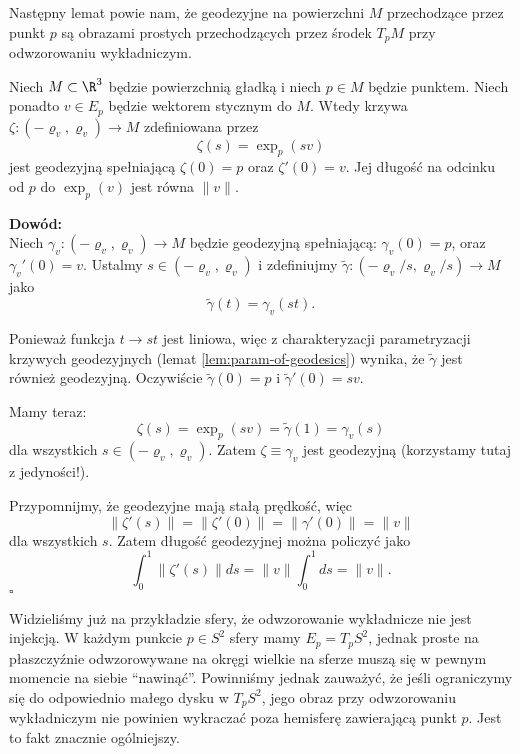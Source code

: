 \begin{frame}
\begin{center}

\end{center}

\end{frame}
Następny lemat powie nam, że geodezyjne na powierzchni $M$ przechodzące przez punkt $p$ są obrazami prostych przechodzących przez środek $T_pM$ przy odwzorowaniu wykładniczym.
\begin{frame}

\begin{lemat}
Niech $M\subset \R^3$ będzie powierzchnią gładką i niech $p\in M$ będzie punktem. Niech ponadto $v\in E_p$ będzie wektorem stycznym do $M$. Wtedy krzywa $\zeta\colon(-\varrho_v,\varrho_v)\to M$ zdefiniowana przez
\[\zeta(s)=\exp_p(sv)\] jest geodezyjną spełniającą $\zeta(0)=p$ oraz $\zeta'(0)=v$. Jej długość na odcinku od $p$ do $\exp_p(v)$ jest równa $\|v\|$.
\end{lemat}


\textcolor{ared}{\textbf{Dowód:}}\\\pause 
Niech $\gamma_v\colon (-\varrho_v,\varrho_v)\to M$ będzie geodezyjną spełniającą: $\gamma_v(0)=p$, oraz $\gamma_v'(0)=v$. Ustalmy $s\in (-\varrho_v,\varrho_v)$ i zdefiniujmy $\widetilde{\gamma}\colon(-\varrho_v/s,\varrho_v/s)\to M$ jako \[\widetilde{\gamma}(t)=\gamma_v(st).\]

\end{frame}
\begin{frame}
Ponieważ funkcja $t\to st$ jest liniowa, więc z charakteryzacji parametryzacji krzywych geodezyjnych (lemat \ref{lem:param-of-geodesics}) wynika, że $\widetilde{\gamma}$ jest również geodezyjną. Oczywiście $\widetilde{\gamma}(0)=p$ i $\widetilde{\gamma}'(0)=sv$.

\pause Mamy teraz:
\[\zeta(s)=\exp_p(sv)=\widetilde{\gamma}(1)=\gamma_v(s)\]
dla wszystkich $s\in (-\varrho_v, \varrho_v)$. Zatem $\zeta\equiv\gamma_v$ jest geodezyjną (korzystamy tutaj z jedyności!).

\pause Przypomnijmy, że geodezyjne mają stałą prędkość, więc
\[\|\zeta'(s)\|=\|\zeta'(0)\|=\|\gamma'(0)\|=\|v\|\]dla wszystkich $s$. Zatem długość geodezyjnej można policzyć jako
\[\int_0^1\|\zeta'(s)\|ds=\|v\|\int_0^1ds=\|v\|.\]
\hfill $\square$

\end{frame}

Widzieliśmy już na przykładzie sfery, że odwzorowanie wykładnicze nie jest injekcją. W każdym punkcie $p\in S^2$ sfery mamy $E_p=T_pS^2$, jednak proste na płaszczyźnie odwzorowywane na okręgi wielkie na sferze muszą się w pewnym momencie na siebie ``nawinąć''. Powinniśmy jednak zauważyć, że jeśli ograniczymy się do odpowiednio małego dysku w $T_pS^2$, jego obraz przy odwzorowaniu wykładniczym nie powinien wykraczać poza hemisferę zawierającą punkt $p$. Jest to fakt znacznie ogólniejszy.


